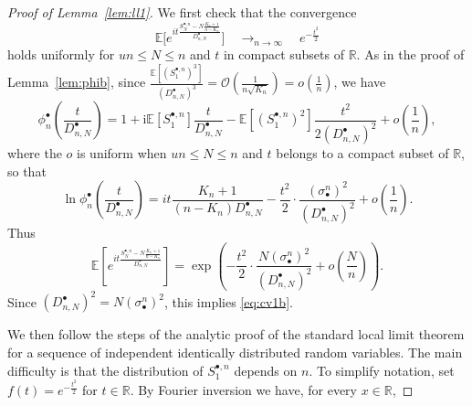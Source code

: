 \documentclass[10pt]{amsart}
\theoremstyle{definition}\newtheorem{defi}[theo]{Definition}\newtheorem{rema}[theo]{Remark}\newtheorem{exam}[theo]{Example}\newtheorem{exem}[theo]{Example}\newtheorem{nota}[theo]{Notation}
\newcommand{\E}{\mathbb{E}}
\newcommand{\R}{\mathbb{R}}
\def\sbn{\sigma_{\bullet}^{n}}
\def\Sbn{S^{\bullet,n}}
\def\phibn{\phi^{\bullet}_{n}}
\def\DbnN{D^{\bullet}_{n,N}}
\newcommand\Es[1]{\mathbb{E}\left[#1\right]}
\begin{document}
\begin{proof}[Proof of Lemma~\ref{lem:ll1}]
We first check that the convergence
\begin{equation}
\label{eq:cv1b}\E\bigg[e^{i t \frac{\Sbn_{N}-N \frac{K_{n}+1}{n-K_{n}} }{ \DbnN }} \bigg]  \quad \mathop{\longrightarrow}_{n \rightarrow \infty} \quad e^{- \frac{t^{2}}{2}}
\end{equation}
holds uniformly for $un \leq N \leq n$ and $t$ in compact subsets of $\R$.  As in the proof of Lemma~\ref{lem:phib}, since $\tfrac{\E[(\Sbn_{1})^{3}]}{(\DbnN)^{3}}=\mathcal O(\tfrac{1}{n \sqrt{K_{n}}})= o(\frac{1}{n})$, we have
\[\phibn\left( \frac{t}{ \DbnN } \right)=1+\textrm{i}\E[\Sbn_{1}] \frac{t}{ \DbnN } - \E[(\Sbn_{1})^{2}] \frac{t^{2}}{2(\DbnN)^{2}}+ o \left( \frac{1}{n} \right),\]
where the $o$ is uniform when $un \leq N \leq n$ and $t$ belongs to a compact subset of $\R$, so that
\[\ln \phibn \left( \frac{t}{ \DbnN } \right)=it  \frac{K_{n}+1}{(n-K_{n})\DbnN} - \frac{t^{2}}{2} \cdot \frac{(\sbn)^{2}}{(\DbnN )^{2}}+ o \left( \frac{1}{n} \right).\]
Thus
\[\Es{e^{i t \frac{\Sbn_{N}-N \frac{K_{n}+1}{n-K_{n}} }{ \DbnN }}}= \exp \left(- \frac{t^{2}}{2} \cdot  \frac{ N (\sbn)^{2} }{(\DbnN)^{2}} + o \left( \frac{N}{n} \right)   \right).\]
Since $(\DbnN)^{2}= N (\sbn)^{2}$, this  implies \eqref{eq:cv1b}.


We then follow the steps of the analytic proof of the standard local limit theorem for a sequence of independent identically distributed random variables. The main difficulty is that the distribution of $\Sbn_{1}$ depends on $n$. To simplify notation, set $f(t)= e^{- \frac{t^{2}}{2}}$ for $t \in \R$. By Fourier inversion we have, for every $x \in \mathbb{R}$,


\end{proof}
\end{document}
